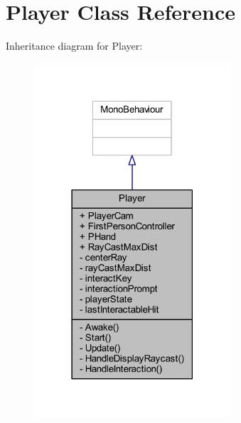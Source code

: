 \hypertarget{class_player}{}\section{Player Class Reference}
\label{class_player}


Inheritance diagram for Player\+:
\nopagebreak
\begin{figure}[H]
\begin{center}
\leavevmode
\includegraphics[width=207pt]{class_player__inherit__graph}
\end{center}
\end{figure}


